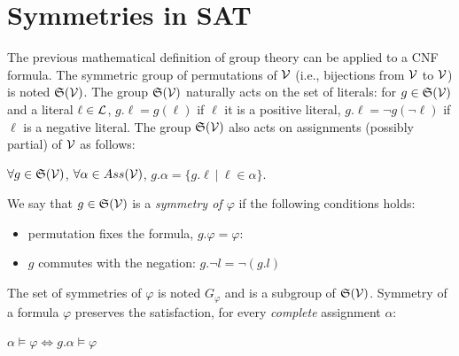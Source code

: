 \section{Symmetries in SAT}
The previous mathematical definition of group theory can be applied to a CNF formula.
The symmetric group of permutations of $\mathcal{V}$ (i.e., bijections from $\mathcal{V}$ to $\mathcal{V}$) is noted
$\mathfrak{S}(\mathcal{V})$. The group $\mathfrak{S}(\mathcal{V})$ naturally acts on the set of literals: for $g
\in \mathfrak{S}(\mathcal{V})$ and a literal $\ell \in \mathcal{L} $, $g.\ell = g(\ell)$ if $\ell$ it is a
positive literal, $g.\ell = \neg g(\neg \ell)$ if $\ell$ is a negative literal.
The group $\mathfrak{S}(\mathcal{V})$ also acts on  assignments (possibly partial) of $\mathcal{V}$ as follows: 
\begin{center}
 $\forall g \in \mathfrak{S}(\mathcal{V})$, $ \forall \alpha \in Ass(\mathcal{V})$, $g.\alpha = \{ g.\ell ~|~ \ell \in \alpha \}$.
\end{center}
 We say that $g\in \mathfrak{S}(\mathcal{V})$ is a \textit{symmetry of $ \varphi$} if the following conditions holds:
\begin{itemize}[topsep=0em]
 \item permutation fixes the formula, $g.\varphi =  \varphi$: 
 \item $g$  commutes with the negation: $g.\neg l  = \neg (g.l)$
\end{itemize}
The set of symmetries of $\varphi$ is noted $G_{\varphi}$ and is a subgroup of $\mathfrak{S}(\mathcal{V})$.
Symmetry of a formula $\varphi$ preserves the satisfaction, for every \emph{complete} assignment $\alpha$:
\begin{center}
 $\alpha \models \varphi\Leftrightarrow g.\alpha \models \varphi$
\end{center}
% 


